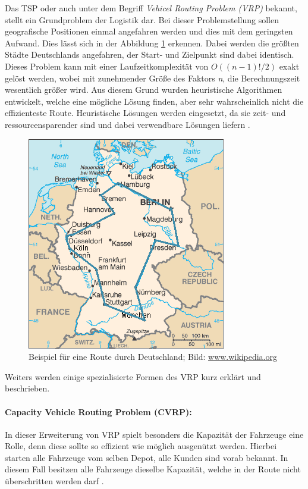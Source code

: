 Das TSP oder auch unter dem Begriff \textit{Vehicel Routing Problem (VRP)} bekannt, stellt ein Grundproblem der Logistik dar. 
Bei dieser Problemstellung sollen geografische Positionen einmal angefahren werden und dies mit dem geringsten Aufwand. 
Dies lässt sich in der Abbildung \ref{fig:tsp} erkennen.
Dabei werden die größten Städte Deutschlands angefahren, der Start- und Zielpunkt sind dabei identisch. 
Dieses Problem kann mit einer Laufzeitkomplexität von $O((n-1)!/2)$ exakt gelöst werden, wobei mit zunehmender Größe des Faktors \textit{n}, die Berechnungszeit wesentlich größer wird. 
Aus diesem Grund wurden heuristische Algorithmen entwickelt, welche eine mögliche Lösung finden, aber sehr wahrscheinlich nicht die effizienteste Route. 
Heuristische Lösungen werden eingesetzt, da sie zeit- und ressourcensparender sind und dabei verwendbare Lösungen liefern \cite{wurzer2010fallbeispiele, laporte1992vehicle}. 
\begin{figure}
	\centering
	\includegraphics[scale=0.8]{images/TSP_Deutschland_3.png}
	\caption{Beispiel für eine Route durch Deutschland; Bild: \url{www.wikipedia.org}}
	\label{fig:tsp}
\end{figure}

\noindent
Weiters werden einige spezialisierte Formen des VRP kurz erklärt und beschrieben. 

\paragraph{Capacity Vehicle Routing Problem (CVRP):}

In dieser Erweiterung von VRP spielt besonders die Kapazität der Fahrzeuge eine Rolle, denn diese sollte so effizient wie möglich ausgenützt werden. 
Hierbei starten alle Fahrzeuge vom selben Depot, alle Kunden sind vorab bekannt. 
In diesem Fall besitzen alle Fahrzeuge dieselbe Kapazität, welche in der Route nicht überschritten werden darf \cite{laporte1992vehicle}. 


